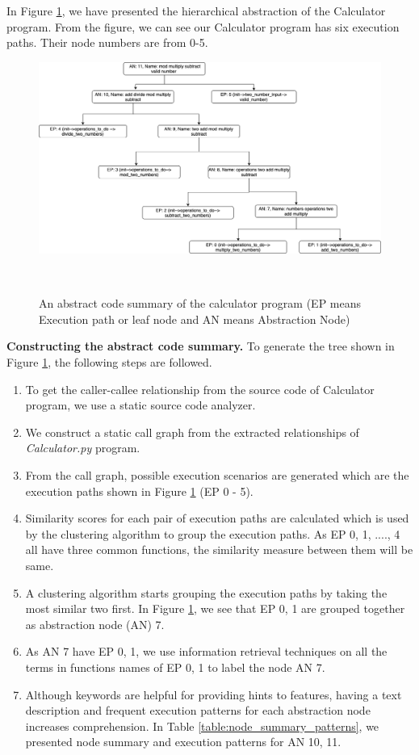 In Figure \ref{fig:motivation}, we have presented the hierarchical abstraction of the Calculator program. From the figure, we can see our Calculator program has six execution paths. Their node numbers are from 0-5. 

\begin{figure}[h]
  \centering
  \includegraphics[width=\columnwidth]{figures/hla2/hla2_motivation.png}
  \caption{An abstract code summary of the calculator program (EP means Execution path or leaf node and AN means Abstraction Node)}~\label{fig:motivation}
\end{figure}

\textbf{Constructing the abstract code summary.} To generate the tree shown in Figure \ref{fig:motivation}, the following steps are followed.

\begin{enumerate}
    \item To get the caller-callee relationship from the source code of Calculator program, we use a static source code analyzer.
    \item We construct a static call graph from the extracted relationships of \emph{Calculator.py} program. 
    \item From the call graph, possible execution scenarios are generated  which are the execution paths shown in Figure \ref{fig:motivation} (EP 0 - 5).
    \item Similarity scores for each pair of execution paths are calculated which is used by the clustering algorithm to group the execution paths. As EP 0, 1, ...., 4 all have three common functions, the similarity measure between them  will be same.  
    \item A clustering algorithm starts grouping the execution paths by taking the most similar two first. In Figure \ref{fig:motivation}, we see that EP 0, 1 are grouped together as abstraction node (AN) 7.
    \item As AN 7 have EP 0, 1, we use information retrieval techniques on all the terms in functions names of EP 0, 1 to label the node AN 7. 
    \item Although keywords are helpful for providing hints to features, having a text description and frequent execution patterns for each abstraction node increases comprehension. In Table \ref{table:node_summary_patterns}, we presented node summary and execution patterns for AN 10, 11. 
    
\end{enumerate}



